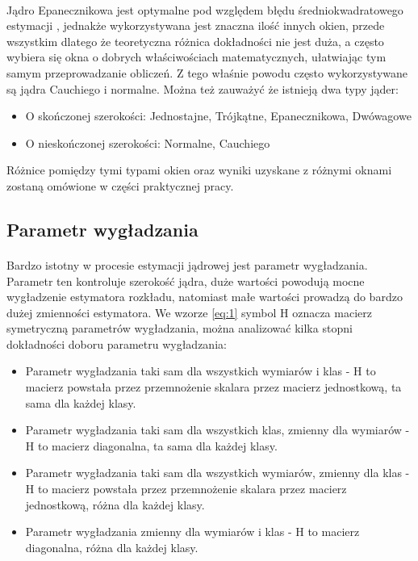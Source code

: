 \documentclass[a4paper,12pt,twoside]{article}
\begin{document}
\paragraph{}
Jądro Epanecznikowa jest optymalne pod względem błędu średniokwadratowego estymacji \cite{epa}, jednakże wykorzystywana jest znaczna ilość innych okien, przede wszystkim dlatego że teoretyczna różnica dokładności nie jest duża, a często wybiera się okna o dobrych właściwościach matematycznych, ułatwiając tym samym przeprowadzanie obliczeń. Z tego właśnie powodu często wykorzystywane są jądra Cauchiego i normalne. Można też zauważyć że istnieją dwa typy jąder: 
\begin{itemize}
\item O skończonej szerokości: Jednostajne, Trójkątne, Epanecznikowa, Dwówagowe
\item O nieskończonej szerokości: Normalne, Cauchiego
\end{itemize}
Różnice pomiędzy tymi typami okien  oraz wyniki uzyskane z różnymi oknami zostaną omówione w części praktycznej pracy.
\subsection{Parametr wygładzania}
\paragraph{}
Bardzo istotny w procesie estymacji jądrowej jest parametr wygładzania. Parametr ten kontroluje szerokość jądra, duże wartości powodują mocne wygładzenie estymatora rozkładu, natomiast małe wartości prowadzą do bardzo dużej zmienności estymatora. We wzorze \ref{eq:1} symbol H oznacza macierz symetryczną parametrów wygładzania, można analizować kilka stopni dokładności doboru parametru wygładzania:
\begin{itemize}
\item Parametr wygładzania taki sam dla wszystkich wymiarów i klas - H to macierz powstała przez przemnożenie skalara przez macierz jednostkową, ta sama dla każdej klasy.
\item Parametr wygładzania taki sam dla wszystkich klas, zmienny dla wymiarów - H to macierz diagonalna, ta sama dla każdej klasy.
\item Parametr wygładzania taki sam dla wszystkich wymiarów, zmienny dla klas - H to macierz powstała przez przemnożenie skalara przez macierz jednostkową, różna dla każdej klasy.
\item Parametr wygładzania zmienny dla wymiarów i klas - H to macierz diagonalna, różna dla każdej klasy.
\end{itemize}
\end{document}
